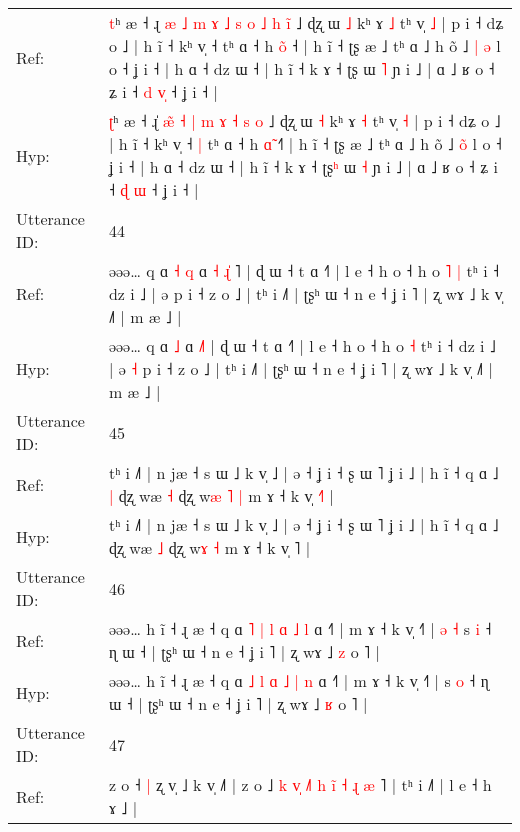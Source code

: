 \documentclass[10pt]{article}
\DeclareRobustCommand{\hl}[1]{{\textcolor{red}{#1}}}
\begin{document}
\begin{longtable}{ll}
Ref: & \hl{t}ʰ æ ˧ ɻ\hl{ }\hl{æ} \hl{˩}\hl{ }\hl{m} \hl{ɤ} \hl{˩} \hl{s} \hl{o} \hl{˩} \hl{h} \hl{i}\hl{̃} ˩ ɖʐ ɯ \hl{˩} kʰ ɤ \hl{˩} tʰ v̩ \hl{˩} | p i ˧ dʑ o ˩ | h ĩ ˧ kʰ v̩ ˧\hl{}\hl{} tʰ ɑ ˧ h \hl{o}̃ ˧\hl{} | h ĩ ˧ ʈʂ æ ˩ tʰ ɑ ˩ h õ ˩ \hl{|}\hl{ }\hl{ə} l o ˧ ʝ i ˧ | h ɑ ˧ dz ɯ ˧ | h ĩ ˧ k ɤ ˧ ʈʂ\hl{} ɯ \hl{˥} ɲ i ˩ | ɑ ˩ ʁ o ˧ ʑ i ˧ \hl{d} \hl{v}\hl{̩} ˧ ʝ i ˧ |
 \\
Hyp: & \hl{ʈ}ʰ æ ˧ ɻ\hl{}\hl{̍} \hl{}\hl{æ}\hl{̃} \hl{˧} \hl{|} \hl{m} \hl{ɤ} \hl{˧} \hl{s} \hl{}\hl{o} ˩ ɖʐ ɯ \hl{˧} kʰ ɤ \hl{˧} tʰ v̩ \hl{˧} | p i ˧ dʑ o ˩ | h ĩ ˧ kʰ v̩ ˧\hl{ }\hl{|} tʰ ɑ ˧ h \hl{ɑ}̃ ˧\hl{˥} | h ĩ ˧ ʈʂ æ ˩ tʰ ɑ ˩ h õ ˩ \hl{}\hl{o}\hl{̃} l o ˧ ʝ i ˧ | h ɑ ˧ dz ɯ ˧ | h ĩ ˧ k ɤ ˧ ʈʂ\hl{ʰ} ɯ \hl{˧} ɲ i ˩ | ɑ ˩ ʁ o ˧ ʑ i ˧ \hl{ɖ} \hl{}\hl{ɯ} ˧ ʝ i ˧ |
 \\
\midrule
Utterance ID: & 44 \\
Ref: & əəə… q ɑ\hl{ }\hl{˧} \hl{q} ɑ\hl{ }\hl{˧} \hl{ɻ}\hl{̍}\hl{ }˥ | ɖ ɯ ˧ t ɑ ˧˥ | l e ˧ h o ˧ h o\hl{ }\hl{˥} \hl{|} tʰ i ˧ dz i ˩ | ə\hl{}\hl{} p i ˧ z o ˩ | tʰ i ˩˥ | ʈʂʰ ɯ ˧ n e ˧ ʝ i ˥ | ʐ wɤ ˩ k v̩ ˩˥ | m æ ˩ |
 \\
Hyp: & əəə… q ɑ\hl{}\hl{} \hl{˩} ɑ\hl{}\hl{} \hl{}\hl{}\hl{˩}˥ | ɖ ɯ ˧ t ɑ ˧˥ | l e ˧ h o ˧ h o\hl{}\hl{} \hl{˧} tʰ i ˧ dz i ˩ | ə\hl{ }\hl{˧} p i ˧ z o ˩ | tʰ i ˩˥ | ʈʂʰ ɯ ˧ n e ˧ ʝ i ˥ | ʐ wɤ ˩ k v̩ ˩˥ | m æ ˩ |
 \\
\midrule
Utterance ID: & 45 \\
Ref: & tʰ i ˩˥ | n jæ ˧ s ɯ ˩ k v̩ ˩ | ə ˧ ʝ i ˧ ʂ ɯ ˥ ʝ i ˩ | h ĩ ˧ q ɑ ˩\hl{ }\hl{|} ɖʐ wæ \hl{˧} ɖʐ w\hl{æ}\hl{ }\hl{˥} \hl{|} m ɤ ˧ k v̩ \hl{˧}˥ |
 \\
Hyp: & tʰ i ˩˥ | n jæ ˧ s ɯ ˩ k v̩ ˩ | ə ˧ ʝ i ˧ ʂ ɯ ˥ ʝ i ˩ | h ĩ ˧ q ɑ ˩\hl{}\hl{} ɖʐ wæ \hl{˩} ɖʐ w\hl{}\hl{}\hl{ɤ} \hl{˧} m ɤ ˧ k v̩ \hl{}˥ |
 \\
\midrule
Utterance ID: & 46 \\
Ref: & əəə… h ĩ ˧ ɻ æ ˧ q ɑ \hl{˥} \hl{|} \hl{l} \hl{ɑ} \hl{˩} \hl{l} ɑ ˧˥ | m ɤ ˧ k v̩ ˧˥ |\hl{ }\hl{ə}\hl{ }\hl{˧} s \hl{i} ˧ ɳ ɯ ˧ | ʈʂʰ ɯ ˧ n e ˧ ʝ i ˥ | ʐ wɤ ˩ \hl{z} o ˥ |
 \\
Hyp: & əəə… h ĩ ˧ ɻ æ ˧ q ɑ \hl{˩} \hl{l} \hl{ɑ} \hl{˩} \hl{|} \hl{n} ɑ ˧˥ | m ɤ ˧ k v̩ ˧˥ |\hl{}\hl{}\hl{}\hl{} s \hl{o} ˧ ɳ ɯ ˧ | ʈʂʰ ɯ ˧ n e ˧ ʝ i ˥ | ʐ wɤ ˩ \hl{ʁ} o ˥ |
 \\
\midrule
Utterance ID: & 47 \\
Ref: & z o ˧\hl{ }\hl{|} ʐ v̩ ˩ k v̩ ˩˥ | z o ˩ \hl{k} \hl{}\hl{v}\hl{̩}\hl{ }\hl{˩}˥ \hl{h} \hl{i}\hl{̃}\hl{ }\hl{˧} \hl{ɻ} \hl{æ} ˥ | tʰ i ˩˥ | l e ˧ h ɤ ˩ |

\end{longtable}
\end{document}
